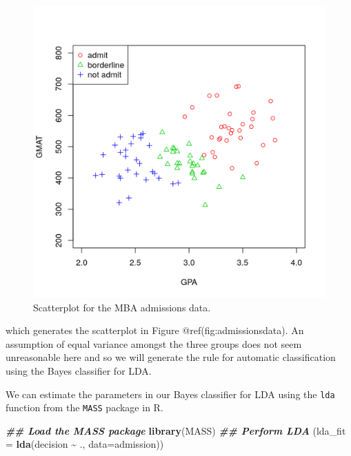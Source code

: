 \documentclass[
]{article}
\newenvironment{Shaded}{\begin{snugshade}}{\end{snugshade}}
\newcommand{\AttributeTok}[1]{\textcolor[rgb]{0.13,0.29,0.53}{#1}}
\newcommand{\DocumentationTok}[1]{\textcolor[rgb]{0.56,0.35,0.01}{\textbf{\textit{#1}}}}
\newcommand{\FunctionTok}[1]{\textcolor[rgb]{0.13,0.29,0.53}{\textbf{#1}}}
\newcommand{\NormalTok}[1]{#1}
\newcommand{\SpecialCharTok}[1]{\textcolor[rgb]{0.81,0.36,0.00}{\textbf{#1}}}
\begin{document}
\begin{figure}[th]

{\centering \includegraphics{admissionsdata-1} 

}

\caption{Scatterplot for the MBA admissions data.}\label{fig:admissionsdata}
\end{figure}

which generates the scatterplot in Figure @ref(fig:admissionsdata). An
assumption of equal variance amongst the three groups does not seem
unreasonable here and so we will generate the rule for automatic
classification using the Bayes classifier for LDA.

We can estimate the parameters in our Bayes classifier for LDA using the
\texttt{lda} function from the \texttt{MASS} package in R.

\begin{Shaded}
\begin{Highlighting}[]
\DocumentationTok{\#\# Load the MASS package}
\FunctionTok{library}\NormalTok{(MASS)}
\DocumentationTok{\#\# Perform LDA}
\NormalTok{(}\AttributeTok{lda\_fit =} \FunctionTok{lda}\NormalTok{(decision }\SpecialCharTok{\textasciitilde{}}\NormalTok{ ., }\AttributeTok{data=}\NormalTok{admission))}
\end{Highlighting}
\end{Shaded}
\end{document}
